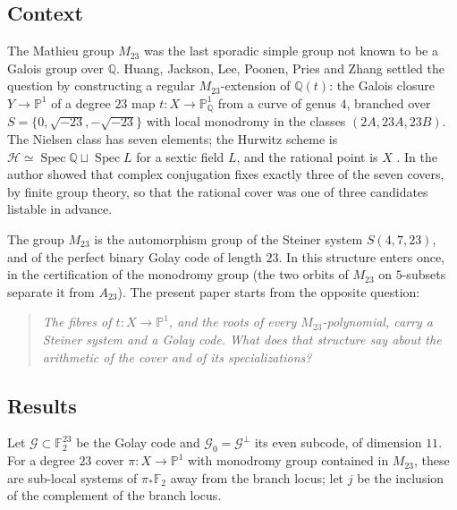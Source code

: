 \documentclass[11pt]{amsart}
\theoremstyle{definition}
\newcommand{\QQ}{\mathbb{Q}}
\newcommand{\FF}{\mathbb{F}}
\newcommand{\PP}{\mathbb{P}}
\newcommand{\M}{M_{23}}
\newcommand{\cG}{\mathcal{G}}
\newcommand{\cH}{\mathcal{H}}
\begin{document}
\subsection{Context}
The Mathieu group $\M$ was the last sporadic simple group not known to be a Galois group over $\QQ$. Huang, Jackson, Lee, Poonen, Pries and Zhang \cite{HJLPPZ26} settled the question by constructing a regular $\M$-extension of $\QQ(t)$: the Galois closure $Y\to\PP^1$ of a degree $23$ map $t\colon X\to\PP^1_\QQ$ from a curve of genus $4$, branched over $S=\{0,\sqrt{-23},-\sqrt{-23}\}$ with local monodromy in the classes $(2A,23A,23B)$. The Nielsen class has seven elements; the Hurwitz scheme is $\cH\simeq\operatorname{Spec}\QQ\sqcup\operatorname{Spec}L$ for a sextic field $L$, and the rational point is $X$ \cite[\S3.7]{HJLPPZ26}. In \cite{Janik26} the author showed that complex conjugation fixes exactly three of the seven covers, by finite group theory, so that the rational cover was one of three candidates listable in advance.

The group $\M$ is the automorphism group of the Steiner system $S(4,7,23)$, and of the perfect binary Golay code of length $23$. In \cite{HJLPPZ26} this structure enters once, in the certification of the monodromy group (the two orbits of $\M$ on $5$-subsets separate it from $A_{23}$). The present paper starts from the opposite question:

\begin{quote}
\emph{The fibres of $t\colon X\to\PP^1$, and the roots of every $\M$-polynomial, carry a Steiner system and a Golay code. What does that structure say about the arithmetic of the cover and of its specializations?}
\end{quote}

\subsection{Results}
Let $\cG\subset\FF_2^{23}$ be the Golay code and $\cG_0=\cG^\perp$ its even subcode, of dimension $11$. For a degree $23$ cover $\pi\colon X\to\PP^1$ with monodromy group contained in $\M$, these are sub-local systems of $\pi_*\FF_2$ away from the branch locus; let $j$ be the inclusion of the complement of the branch locus.
\end{document}
